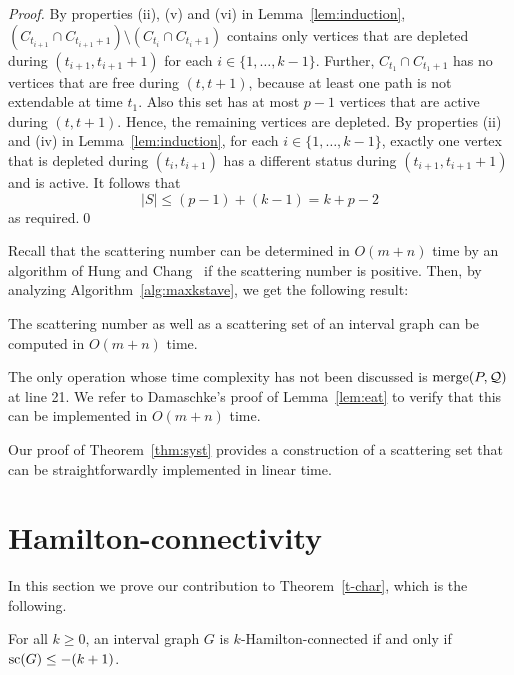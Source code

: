 \documentclass{llncs}
\DeclareMathOperator{\scat}{{\rm sc}}
\DeclareMathOperator{\merg}{{\rm merge}}
\newcommand{\cQ}{{\mathcal Q}}
\begin{document}
\begin{proof}
By properties (ii), (v) and (vi) in Lemma~\ref{lem:induction}, $(C_{t_{i+1}}\cap C_{t_{i+1}+1})\setminus (C_{t_{i}}\cap C_{t_{i}+1}) $ contains only vertices that are depleted during $(t_{i+1},t_{i+1}+1)$ for each $i\in\{1,\ldots,k-1\}$. Further, $C_{t_1}\cap C_{t_1+1}$  has no vertices that are free during $(t,t+1)$, because at least one path is not extendable at time $t_1$. Also 
this set has at most  $p-1$ vertices that are active during $(t,t+1)$. Hence, the remaining vertices are depleted.
By properties (ii) and (iv) in Lemma~\ref{lem:induction}, for each $i\in\{1,\ldots,k-1\}$, exactly one vertex that is depleted during $(t_i,t_{i+1})$ has a different status during $(t_{i+1},t_{i+1}+1)$ and is active.
It follows that 
\begin{equation*}
  |S| \leq (p-1) + (k-1) = k+p-2
\end{equation*}
as required.\qed
\end{proof}

Recall that 
the scattering number can be determined in $O(m+n)$ time by an algorithm of Hung and Chang~\cite{HC11}
if the scattering number is positive. 
Then, by analyzing Algorithm~\ref{alg:maxkstave}, we get the following result:

\begin{corollary}\label{c-scat}
The scattering number as well as a scattering set of an interval graph can be computed in $O(m+n)$ time.
\end{corollary}
The only operation whose time complexity has not been discussed is $\merg(P,\cQ)$ at line 21. 
We refer to Damaschke's proof of Lemma~\ref{lem:eat} to verify that this can be implemented in $O(m+n)$ time.

Our proof of Theorem~\ref{thm:syst} provides a construction 
of a scattering set that can be straightforwardly implemented in linear time.

\section{Hamilton-connectivity}\label{s-char}

In this section we prove our contribution to  Theorem~\ref{t-char}, which is the following.

\begin{theorem}\label{t-ham}
For all $k\geq 0$, an interval graph $G$ is $k$-Hamilton-connected if and only if  $\scat(G)\leq -(k+1)$.
\end{theorem}
\end{document}
